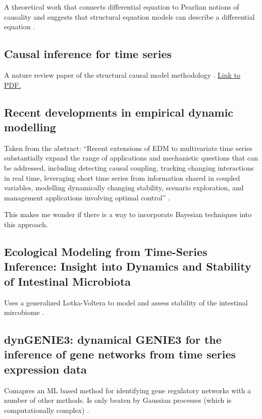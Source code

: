 \documentclass{article}
\begin{document}
        A theoretical work that connects differential equation to Pearlian notions of causality
        and suggests that structural equation models can describe a differential equation \cite{mooij2013ordinary}.

    \subsection{Causal inference for time series}
        
        A nature review paper of the structural causal model methodology \cite{runge2023causal}.
        \href{https://climateinformaticslab.com/wp-content/uploads/2023/06/Runge_Causal_Inference_for_Time_Series_NREE.pdf}
        {Link to PDF.}

    \subsection{Recent developments in empirical dynamic modelling}

        Taken from the abstract: ``Recent extensions of EDM to multivariate
        time series substantially expand the range of applications and mechanistic
        questions that can be addressed, including detecting causal coupling, tracking
        changing interactions in real time, leveraging short time series from information shared
        in coupled variables, modelling dynamically changing stability, scenario exploration, and management
        applications involving optimal control'' \cite{munch2023recent}.

        This makes me wonder if there is a way to incorporate Bayesian techniques
        into this approach.

    \subsection{Ecological Modeling from Time-Series Inference: Insight into Dynamics and Stability of Intestinal Microbiota}

        Uses a generalized Lotka-Voltera to model and assess stability of the intestinal mircobiome \cite{stein2013ecological}.
        
    \subsection{dynGENIE3: dynamical GENIE3 for the inference of gene networks from time series expression data}
        Comapres an ML based method for identifying gene regulatory networks with a number of other methods. Is only
        beaten by Gaussian processes (which is computationally complex) \cite{huynhthu2018dynenie3}.
\end{document}
